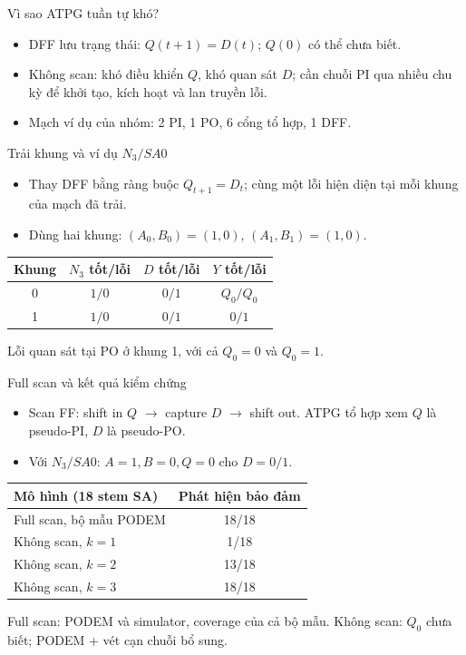\begin{frame}{Vì sao ATPG tuần tự khó?}
\small
\begin{itemize}
  \item DFF lưu trạng thái: $Q(t+1)=D(t)$; $Q(0)$ có thể chưa biết.
  \item Không scan: khó điều khiển $Q$, khó quan sát $D$; cần chuỗi PI
        qua nhiều chu kỳ để khởi tạo, kích hoạt và lan truyền lỗi.
  \item Mạch ví dụ của nhóm: 2 PI, 1 PO, 6 cổng tổ hợp, 1 DFF.
\end{itemize}
\vspace{1mm}
\centering
\resizebox{0.7\textwidth}{!}{}
\end{frame}

\begin{frame}{Trải khung và ví dụ $N_3/SA0$}
\small
\begin{itemize}
  \item Thay DFF bằng ràng buộc $Q_{t+1}=D_t$; cùng một lỗi hiện diện
        tại mỗi khung của mạch đã trải.
  \item Dùng hai khung: $(A_0,B_0)=(1,0)$, $(A_1,B_1)=(1,0)$.
\end{itemize}
\begin{center}
\begin{tabular}{@{}c c c c@{}}
\toprule
Khung & $N_3$ tốt/lỗi & $D$ tốt/lỗi & $Y$ tốt/lỗi\\
\midrule
0 & $1/0$ & $0/1$ & $Q_0/Q_0$\\
1 & $1/0$ & $0/1$ & $0/1$\\
\bottomrule
\end{tabular}
\end{center}
\centering Lỗi quan sát tại PO ở khung 1, với cả $Q_0=0$ và $Q_0=1$.
\end{frame}

\begin{frame}{Full scan và kết quả kiểm chứng}
\small
\begin{itemize}
  \item Scan FF: shift in $Q$ $\rightarrow$ capture $D$ $\rightarrow$ shift out.
        ATPG tổ hợp xem $Q$ là pseudo-PI, $D$ là pseudo-PO.
  \item Với $N_3/SA0$: $A=1,B=0,Q=0$ cho $D=0/1$.
\end{itemize}
\begin{center}
\begin{tabular}{@{}lc@{}}
\toprule
Mô hình (18 stem SA) & Phát hiện bảo đảm\\
\midrule
Full scan, bộ mẫu PODEM & 18/18\\
Không scan, $k=1$ & 1/18\\
Không scan, $k=2$ & 13/18\\
Không scan, $k=3$ & 18/18\\
\bottomrule
\end{tabular}
\end{center}
\footnotesize Full scan: PODEM và simulator, coverage của cả bộ mẫu.
Không scan: $Q_0$ chưa biết; PODEM + vét cạn chuỗi bổ sung.
\end{frame}
